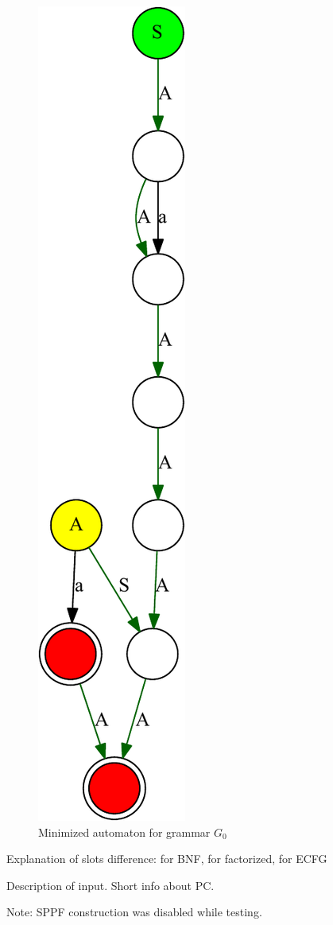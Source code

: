 \documentclass[runningheads,a4paper]{llncs}
\begin{document}
\begin{figure}
\centering
\includegraphics[height=0.95\textwidth,angle=90]{pictures/minimizedDFA.pdf}
\caption{\label{dfa}Minimized automaton for grammar $G_0$}
\end{figure}

Explanation of slots difference: for BNF, for factorized, for ECFG

Description of input. 
Short info about PC.

Note: SPPF construction was disabled while testing.
\end{document}
